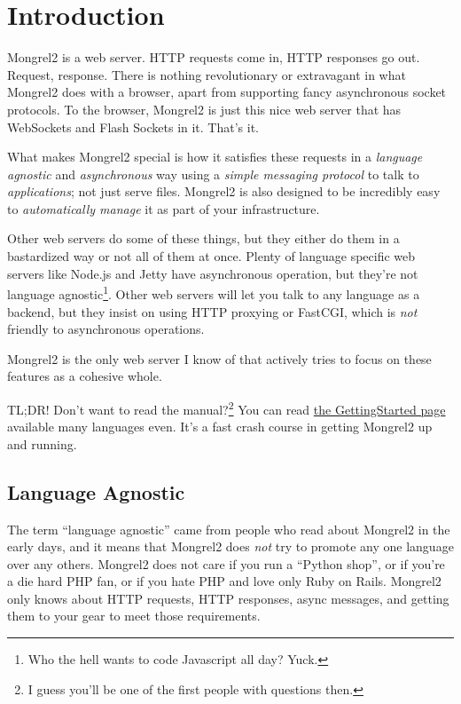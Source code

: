 \chapter{Introduction}

Mongrel2 is a web server.  HTTP requests come in, HTTP responses go out.
Request, response.  There is nothing revolutionary or extravagant in what
Mongrel2 does with a browser, apart from supporting fancy asynchronous socket
protocols.  To the browser, Mongrel2 is just this nice web server that has
WebSockets and Flash Sockets in it.  That's it.

What makes Mongrel2 special is how it satisfies these requests in a \emph{
language agnostic} and \emph{asynchronous} way using a \emph{simple messaging
protocol} to talk to \emph{applications}; not just serve files.  Mongrel2 is also
designed to be incredibly easy to \emph{automatically manage} it as part of your
infrastructure.

Other web servers do some of these things, but they either do them in a bastardized
way or not all of them at once.  Plenty of language specific web servers like Node.js
and Jetty have asynchronous operation, but they're not language
agnostic\footnote{Who the hell wants to code Javascript all day?  Yuck.}.  Other web servers
will let you talk to any language as a backend, but they insist on using HTTP
proxying or FastCGI, which is \emph{not} friendly to asynchronous operations.

Mongrel2 is the only web server I know of that actively tries to focus on these
features as a cohesive whole.

\begin{aside}{TL;DR!}
Don't want to read the manual?\footnote{I guess you'll be one of the first people with questions then.}
You can read \href{http://mongrel2.org/wiki?name=GettingStarted}{the GettingStarted page} available
many languages even.  It's a fast crash course in getting Mongrel2 up and running.
\end{aside}

\section{Language Agnostic}

The term ``language agnostic'' came from people who read about Mongrel2 in the
early days, and it means that Mongrel2 does \emph{not} try to promote any one
language over any others.  Mongrel2 does not care if you run a ``Python shop'', or
if you're a die hard PHP fan, or if you hate PHP and love only Ruby on Rails.
Mongrel2 only knows about HTTP requests, HTTP responses, async messages, and
getting them to your gear to meet those requirements.

